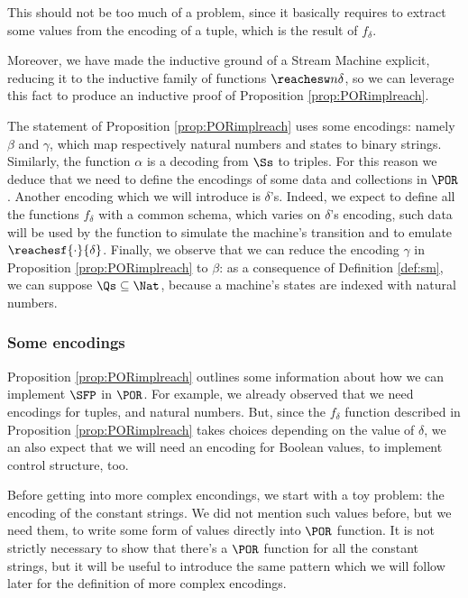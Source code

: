 \begin{conditional}{\notappendix}
  This should not be too much of a problem, since it basically requires to
  extract some values from the encoding of a tuple, which is the result of $f_\delta$.


  Moreover, we have made the inductive ground of a Stream Machine explicit, reducing it
  to the inductive family of functions $\reachesw n \delta$, so we can leverage
  this fact to produce an inductive proof of Proposition \ref{prop:PORimplreach}.

  The statement of Proposition \ref{prop:PORimplreach} uses
  some encodings: namely $\beta$ and $\gamma$, which
  map respectively natural numbers and states to binary strings.
  Similarly, the function $\alpha$ is a decoding from $\Ss$ to triples.
  For this reason
  we deduce that we need to define the encodings of some
  data and collections in $\POR$.
  Another encoding which we will introduce is
  $\delta$'s. Indeed, we expect to define all the functions $f_\delta$ with a common
  schema, which varies on $\delta$'s encoding, such data will be used by the function
  to simulate the machine's transition and to emulate $\reachesf{\cdot}{\delta}$.
  Finally, we observe that we can reduce the encoding $\gamma$ in Proposition
  \ref{prop:PORimplreach} to $\beta$: as a consequence of
  Definition \ref{def:sm}, we can suppose $\Qs \subseteq \Nat$, because a machine's
  states are indexed with natural numbers.















  \subsubsection{Some encodings}
  \label{subsub:encodings}

  Proposition \ref{prop:PORimplreach} outlines some information about how we can
  implement $\SFP$ in $\POR$. For example, we already observed that we need encodings
  for tuples, and natural numbers. But, since the $f_\delta$ function
  described in Proposition \ref{prop:PORimplreach} takes choices
  depending on the value of $\delta$, we an also expect that we will need an
  encoding for Boolean values, to implement control structure, too.

  Before getting into more complex encondings, we start with a toy problem:
  the encoding of the constant strings. We did not mention such values before,
  but we need them, to write some form
  of values directly into $\POR$ function.
  It is not strictly necessary
  to show that there's a $\POR$ function for all the constant strings,
  but it will be useful to
  introduce the same pattern which we will follow later for the definition of more
  complex encodings.


\end{conditional}
